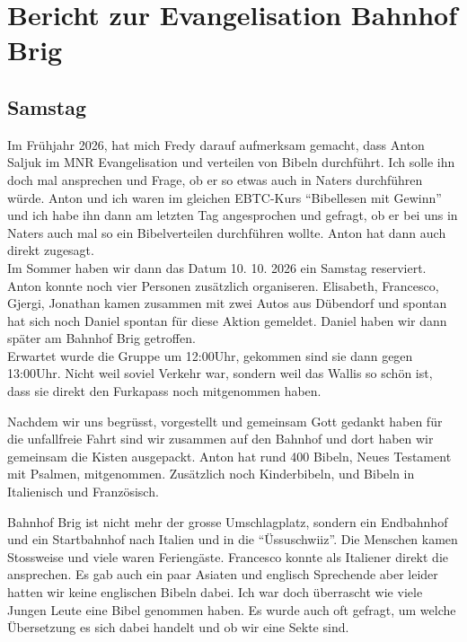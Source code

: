\documentclass[fontsize=14pt]{mybib}
\author{OTS}
\begin{document}
    \section*{Bericht zur Evangelisation Bahnhof Brig}
    \subsection*{Samstag}
    Im Frühjahr 2026, hat mich Fredy darauf aufmerksam gemacht, dass Anton Saljuk im MNR Evangelisation und verteilen von Bibeln durchführt. Ich solle ihn doch mal ansprechen und Frage, ob er so etwas auch in Naters durchführen würde. Anton und ich waren im gleichen EBTC-Kurs \enquote{Bibellesen mit Gewinn} und ich habe ihn dann am letzten Tag angesprochen und gefragt, ob er bei uns in Naters auch mal so ein Bibelverteilen durchführen wollte. Anton hat dann auch direkt zugesagt.\\
    Im Sommer haben wir dann das Datum 10. 10. 2026 ein Samstag reserviert. Anton konnte noch vier Personen zusätzlich organiseren. Elisabeth, Francesco, Gjergi, Jonathan kamen zusammen mit zwei Autos aus Dübendorf und spontan hat sich noch Daniel spontan für diese Aktion gemeldet. Daniel haben wir dann später am Bahnhof Brig getroffen.\\
    Erwartet wurde die Gruppe um 12:00Uhr, gekommen sind sie dann gegen 13:00Uhr. Nicht weil soviel Verkehr war, sondern weil das Wallis so schön ist, dass sie direkt den Furkapass noch mitgenommen haben.
    
    Nachdem wir uns begrüsst, vorgestellt und gemeinsam Gott gedankt haben für die unfallfreie Fahrt sind wir zusammen auf den Bahnhof und dort haben wir gemeinsam die Kisten ausgepackt. Anton hat rund 400 Bibeln, Neues Testament mit Psalmen, mitgenommen. Zusätzlich noch Kinderbibeln, und Bibeln in Italienisch und Französisch.

    Bahnhof Brig ist nicht mehr der grosse Umschlagplatz, sondern ein Endbahnhof und ein Startbahnhof nach Italien und in die \enquote{Üssuschwiiz}. Die Menschen kamen Stossweise und viele waren Feriengäste. Francesco konnte als Italiener direkt die ansprechen. Es gab auch ein paar Asiaten und englisch Sprechende aber leider hatten wir keine englischen Bibeln dabei. Ich war doch überrascht wie viele Jungen Leute eine Bibel genommen haben. Es wurde auch oft gefragt, um welche Übersetzung es sich dabei handelt und ob wir eine Sekte sind.
\end{document}
